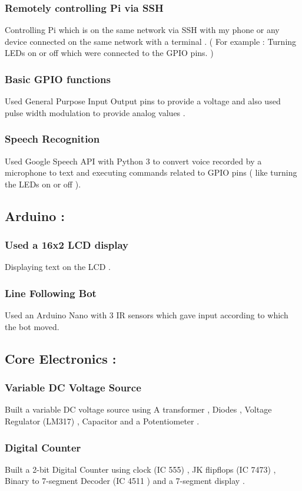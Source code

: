 \documentclass{article}
\begin{document}
    \subsubsection{Remotely controlling Pi via SSH}
    Controlling Pi which is on the same network via SSH with my phone or any device connected on the same network with a terminal .
    ( For example : Turning LEDs on or off which were connected to the GPIO pins. ) 
    \subsubsection{Basic GPIO functions}
    Used General Purpose Input Output pins to provide a voltage and also used pulse width modulation to provide analog values .
    \subsubsection{Speech Recognition}
    Used Google Speech API with Python 3 to convert voice recorded by a microphone
    to text and executing commands related to GPIO pins ( like turning the LEDs on or off ).
    \subsection{Arduino :}
    \subsubsection{Used a 16x2 LCD display}
    Displaying text on the LCD .
    \subsubsection{Line Following Bot}
    Used an Arduino Nano with 3 IR sensors which gave input according to which the bot moved. 
    \subsection{Core Electronics :}
    \subsubsection{Variable DC Voltage Source}
    Built a variable DC voltage source using A transformer , Diodes , Voltage Regulator (LM317) , Capacitor and a Potentiometer .
    \subsubsection{Digital Counter}
    Built a 2-bit Digital Counter using clock (IC 555) , JK flipflops (IC 7473) , Binary to 7-segment Decoder (IC 4511 ) and a 7-segment display .
    
    
    
     
\end{document}
